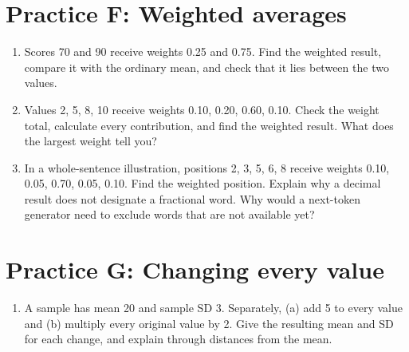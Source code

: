 \section*{Practice F: Weighted averages}
\begin{enumerate}[label=F\arabic*.,leftmargin=2.5em,itemsep=10pt]
\item Scores 70 and 90 receive weights 0.25 and 0.75. Find the weighted result, compare it with the ordinary mean, and check that it lies between the two values.
\item Values 2, 5, 8, 10 receive weights 0.10, 0.20, 0.60, 0.10. Check the weight total, calculate every contribution, and find the weighted result. What does the largest weight tell you?
\item In a whole-sentence illustration, positions 2, 3, 5, 6, 8 receive weights 0.10, 0.05, 0.70, 0.05, 0.10. Find the weighted position. Explain why a decimal result does not designate a fractional word. Why would a next-token generator need to exclude words that are not available yet?
\end{enumerate}
\section*{Practice G: Changing every value}
\begin{enumerate}[label=G\arabic*.,leftmargin=2.5em,itemsep=10pt]
\item A sample has mean 20 and sample SD 3. Separately, (a) add 5 to every value and (b) multiply every original value by 2. Give the resulting mean and SD for each change, and explain through distances from the mean.
\end{enumerate}

